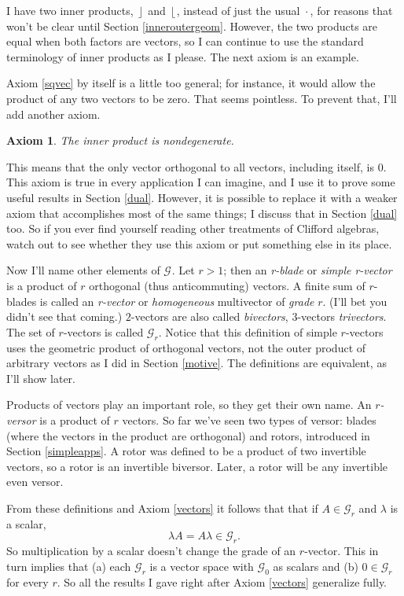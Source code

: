\documentclass{utarticle}
\newcommand{\G}[1][]{\ensuremath{\mathcal{G}_{#1}}}
\DeclareMathOperator{\inp}{\cdot}
\DeclareMathOperator{\lin}{\rfloor}
\DeclareMathOperator{\rin}{\lfloor}
\newtheorem{axiom}{Axiom}
\begin{document}
I have two inner products, $\lin$ and $\rin$, instead of just the usual $\inp$, for 
reasons that won't be clear until Section \ref{inneroutergeom}.  However, the two 
products are equal when both factors are vectors, so I can continue
to use the standard terminology of inner products as I please.  The next
axiom is an example.

Axiom \ref{sqvec} by itself is a little too general; for instance, it
would allow the product of any two vectors to be zero.  That seems 
pointless.  To prevent that, I'll add another axiom.

\begin{axiom}
The inner product is nondegenerate.
\label{nondeg}
\end{axiom}

This means that the only vector orthogonal to all vectors, including itself, is $0$.
This axiom is true in every application I can imagine, and I use it to prove some
useful results in Section \ref{dual}.  However, it is possible to replace it with a 
weaker axiom that accomplishes most of the same things; I discuss that in Section 
\ref{dual} too.  So if you ever find yourself reading other treatments of Clifford algebras,
watch out to see whether they use this axiom or put something else in its place.

Now I'll name other elements of \G.  Let $r > 1$; then an \emph{r-blade} or 
\emph{simple r-vector} is a product of  $r$ orthogonal (thus anticommuting) vectors.
A finite sum of $r$-blades is called an \emph{r-vector} or  \emph{homogeneous} 
multivector of \emph{grade} $r$.  (I'll bet you didn't see that coming.)  $2$-vectors are also 
called \emph{bivectors}, $3$-vectors \emph{trivectors}.  The set of $r$-vectors is called \G[r].  
Notice that this 
definition of simple $r$-vectors uses the geometric product of orthogonal vectors, 
not the outer product of arbitrary vectors as I did in Section \ref{motive}.  The definitions are 
equivalent, as I'll show later.

Products of vectors play an important role, so they get their own name.  
An \emph{$r$-versor} is a product of $r$ vectors.  So far we've seen two types
of versor: blades (where the vectors in the product are orthogonal) and rotors,
introduced in Section \ref{simpleapps}.  A rotor was defined to be a product of
two invertible vectors, so a rotor is an invertible biversor.  Later, a rotor will be 
any invertible even versor.

From these definitions and Axiom \ref{vectors} it follows 
that that if $A \in \G[r]$ and $\lambda$ is a scalar,
\begin{equation}
\lambda A = A \lambda \in \G[r].
\end{equation}
So multiplication by a scalar doesn't change the grade of an $r$-vector.  
This in turn implies that (a) each \G[r] is a vector space with \G[0] as 
scalars and (b) $0 \in \G[r]$ for every $r$.  So all the results I gave 
right after Axiom \ref{vectors} generalize fully.
\end{document}
